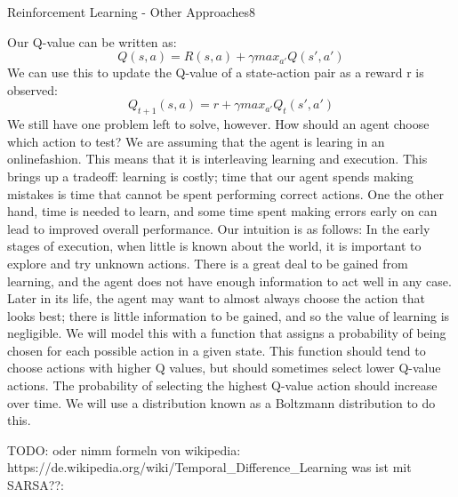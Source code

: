 \begin{questions}
\begin{question}[bonus]{Reinforcement Learning - Other Approaches}{8}
\begin{answer}
Our Q-value can be written as:
\begin{equation}
Q(s,a)=R(s,a)+\gamma max_{a'} Q(s',a')
\end{equation}
We can use this to update the Q-value of a state-action pair as a reward r is observed:
\begin{equation}
Q_{t+1}(s,a)=r+\gamma max_{a'} Q_t(s',a')
\end{equation}
We still have one problem left to solve, however. How should an agent choose which action to test? We are assuming that the agent is learing in an onlinefashion.
This means that it is interleaving learning and execution. This brings up a tradeoff: learning is costly; time that our agent spends making mistakes is time that cannot be spent performing correct actions. One the other hand, time is needed to learn, and some time spent making errors early on can lead to improved overall performance. Our intuition is as follows: In the early stages of execution, when little is known about the world, it is important to explore and try unknown actions. There
is a great deal to be gained from learning, and the agent does not have enough information to act well in any case. Later in its life, the agent may want to almost always choose the action that looks best; there is little information to be gained, and so the value of learning is negligible. We will model this with a function that assigns a probability of being chosen for each possible action in a given state. This function should tend to choose actions with higher Q values, but should sometimes select lower Q-value actions. The probability of selecting the highest Q-value action should increase over time. We will use a distribution known as a Boltzmann distribution to do this.

TODO: oder nimm formeln von wikipedia: https://de.wikipedia.org/wiki/Temporal\_Difference\_Learning
was ist mit SARSA??: 
\end{answer}
\end{question}


\end{questions}
